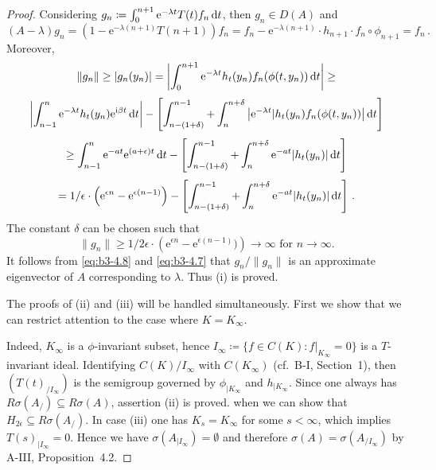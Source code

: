 \begin{proof}
	Considering $g_{n}\coloneq \int_{0}^{n+1} \mathrm{e}^{-\lambda t} T(t)f_{n} \mathop{}\!\mathrm{d}{t}$, then $g_{n} \in D(A)$ and
	\begin{equation}\label{eq:b3-4.7}
		(A - \lambda)g_{n} = (1 - \mathrm{e}^{-\lambda(n+1)}T(n+1))f_{n} = f_{n} - \mathrm{e}^{-\lambda(n+1)} \cdot h_{n+1} \cdot f_{n} \circ \phi_{n+1} = f_{n}\,.
	\end{equation}
	Moreover,
	\[\|g_{n}\| \geq |g_{n}(y_{n})| = \left|\int_{0}^{n+1} \mathrm{e}^{-\lambda t} h_{t}(y_{n})f_{n}(\phi(t,y_{n})) \mathop{}\!\mathrm{d}{t} \right| \geq\]
	\[\left|\int_{n-1}^{n} \mathrm{e}^{-\lambda t} h_{t}(y_{n}) \mathrm{e}^{\mathrm{i}\beta  t} \mathop{}\!\mathrm{d}{t}\right| - \left[\int_{n-(1+\delta)}^{n-1} + \int_{n}^{n+\delta}\left| \mathrm{e}^{-\lambda t}|h_{t}(y_{n})f_{n}(\phi(t,y_{n}))\right| \mathop{}\!\mathrm{d}{t}\right]\]
	\[\geq \int_{n-1}^{n} \mathrm{e}^{-at} \mathrm{e}^{(a+\epsilon)t} \mathop{}\!\mathrm{d}{t} - \left[\int_{n-(1+\delta)}^{n-1} + \int_{n}^{n+\delta} \mathrm{e}^{-at}|h_{t}(y_{n})| \mathop{}\!\mathrm{d}{t}\right]\]
	\[= 1/\epsilon \cdot\left(\mathrm{e}^{\epsilon n} - \mathrm{e}^{\epsilon(n-1)}\right) - \left[\int_{n-(1+\delta)}^{n-1} + \int_{n}^{n+\delta} \mathrm{e}^{-at}|h_{t}(y_{n})| \mathop{}\!\mathrm{d}{t}\right]\,.\]
	The constant $\delta$ can be chosen such that
	\begin{equation}\label{eq:b3-4.8}
		\|g_{n}\| \geq 1/2\epsilon \cdot\left(\mathrm{e}^{\epsilon n} - \mathrm{e}^{\epsilon(n-1)})\right) \to \infty \text{ for } n \to \infty.
	\end{equation}
	It follows from \eqref{eq:b3-4.8} and \eqref{eq:b3-4.7} that $ g_n / \|g_n\|$ is an approximate
	eigenvector of $A$ corresponding to $\lambda$. 
    Thus (i) is proved. 
	
	The 
	proofs of (ii) and (iii) will be handled simultaneously. 
    First we show that we can restrict attention to the case where $K = K_\infty$.
	
	Indeed, $K_{\infty}$ is a $\phi$-invariant subset, hence $I_{\infty}\coloneq \{f \in C(K) : f|_{K_{\infty}} = 0\}$ is a $T$-invariant ideal.
	Identifying $C(K)/I_{\infty}$ with $C(K_{\infty})$ (cf.\ B-I, Section~1), then $(T(t)_{/I_{\infty}})$ is the semigroup governed by $\phi_{|K_{\infty}}$ and $h_{|K_{\infty}}$.
	Since one always has $R{\sigma}(A_{/}) \subseteq R{\sigma}(A)$, assertion (ii) is proved.
	when we can show that $H_{2\epsilon} \subseteq R{\sigma}(A_{/})$.
	In case (iii) one has $K_{s} = K_{\infty}$ for some $s < \infty$, which implies $T(s)_{|I_{\infty}} = 0$.
	Hence we have $\sigma(A_{|I_{\infty}}) = \emptyset$ and therefore $\sigma(A) = \sigma(A_{/I_{\infty}})$ by A-III, Proposition~4.2.
	

\end{proof}
